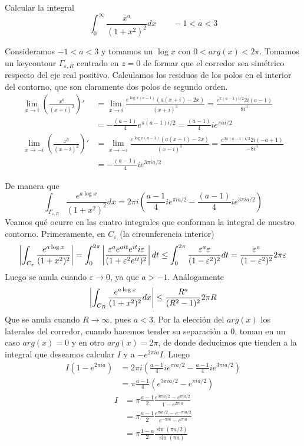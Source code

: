 \documentclass[twoside]{article}
\begin{document}
\begin{ejercicio}{3}
Calcular la integral
$$
\int_0^\infty \frac{x^a}{(1+x^2)^2}dx \qquad -1<a<3
$$
\end{ejercicio}
\begin{solucion}
Consideramos $-1<a<3$ y tomamos un $\log x$ con $0<arg(x)<2\pi$.  Tomamos un keycontour $\Gamma_{\varepsilon,R}$ centrado en $z=0$ de formar que el corredor sea simétrico respecto del eje  real positivo. Calculamos los residuos de los polos en el interior del contorno, que son claramente dos polos de segundo orden.
\begin{align*}
\lim_{x\to i} \left(\frac{x^a}{(x+i)^2}\right)' &= \lim_{x\to i}\frac{e^{\log{x}(a-1)}(a(x+i)-2x)}{(x+i)^3} = \frac{e^{\pi (a-1)i/2}2i(a-1)}{8i^3}\\ 
&=-\frac{(a-1)}{4}e^{\pi (a-1)i/2} =\frac{(a-1)}{4}ie^{\pi ai/2} \\
\lim_{x\to -i} \left(\frac{x^a}{(x-i)^2}\right)' &= \lim_{x\to -i}\frac{e^{\log{x}(a-1)}(a(x-i)-2x)}{(x-i)^3} =\frac{e^{3\pi (a-1)i/2}2i(-a+1)}{-8i^3}\\ 
&=-\frac{(a-1)}{4}i e^{3\pi i a /2}
\end{align*}

De manera que
$$
\int_{\Gamma_{\varepsilon,R}} \frac{e^{a \log x}}{(1+x^2)^2}dx = 2\pi i\left( \frac{a-1}{4}ie^{\pi i a/2}-\frac{(a-1)}{4}i e^{3\pi i a /2}\right)
$$
Veamos qué ocurre en las cuatro integrales que conforman la integral de nuestro contorno. Primeramente, en $C_\varepsilon$ (la circunferencia interior)
$$
\left\lvert\int_{C_\varepsilon}\frac{e^{a \log x}}{(1+x^2)^2} \right\rvert=\int_0^{2\pi} \left\lvert\frac{\varepsilon^a e^{ait} e^{it} i \varepsilon}{(1+\varepsilon^2e^{it})^2}\right\rvert dt\leq \int_0^{2\pi}\frac{\varepsilon^a\varepsilon}{(1-\varepsilon^2)^2}dt = \frac{\varepsilon^a}{(1-\varepsilon^2)^2}2\pi \varepsilon 
$$ 
Luego se anula cuando $\varepsilon \to 0$, ya que $a>-1$. Análogamente
$$
\left\lvert\int_{C_R} \frac{e^{a \log x}}{(1+x^2)^2} dx \right\rvert \leq  \frac{R^a}{(R^2-1)^2}2\pi R
$$
Que se anula cuando $R\to\infty$, pues $a<3$. Por la elección del $arg(x)$ los laterales del corredor, cuando hacemos tender su separación a $0$, toman en un caso $arg(x)=0$ y en otro $arg(x)=2\pi$, de donde deducimos que tienden a la integral que deseamos calcular $I$ y a $-e^{2\pi i a}I$. Luego
\begin{align*}
I(1-e^{2\pi i a}) &= 2\pi i\left( \frac{a-1}{4}ie^{\pi i a/2}-\frac{a-1}{4}ie^{3\pi i a /2}\right) \\
&= \pi  \frac{a-1}{4}\left(e^{3\pi i a/2}-e^{\pi i a /2}\right)
\end{align*}
\begin{align*}
I& = \pi  \frac{a-1}{2}\frac{e^{3\pi i a/2}-e^{\pi i a /2}}{1-e^{2\pi i a}}\\
& = \pi  \frac{a-1}{2}\frac{e^{\pi i a/2}-e^{-\pi i a /2}}{e^{-\pi i a}-e^{\pi i a}}\\
& =\pi \frac{1-a}{2}\frac{\sin(\pi a /2)}{\sin(\pi a)}
\end{align*}
\end{solucion}
\newpage
\end{document}
